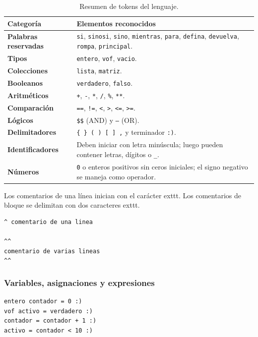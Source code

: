 \documentclass[11pt,letterpaper]{article}
\begin{document}
\begin{table}[H]
\centering
\caption{Resumen de tokens del lenguaje.}
\begin{tabularx}{\textwidth}{>{\bfseries}p{3.1cm}X}
\toprule
Categoría & Elementos reconocidos \\
\midrule
Palabras reservadas & \texttt{si}, \texttt{sinosi}, \texttt{sino}, \texttt{mientras}, \texttt{para}, \texttt{defina}, \texttt{devuelva}, \texttt{rompa}, \texttt{principal}. \\
Tipos & \texttt{entero}, \texttt{vof}, \texttt{vacio}. \\
Colecciones & \texttt{lista}, \texttt{matriz}. \\
Booleanos & \texttt{verdadero}, \texttt{falso}. \\
Aritméticos & \texttt{+}, \texttt{-}, \texttt{*}, \texttt{/}, \texttt{\%}, \texttt{**}. \\
Comparación & \texttt{==}, \texttt{!=}, \texttt{<}, \texttt{>}, \texttt{<=}, \texttt{>=}. \\
Lógicos & \texttt{\$\$} (AND) y \texttt{--} (OR). \\
Delimitadores & \texttt{\{ \} ( ) [ ] ,} y terminador \texttt{:)}. \\
Identificadores & Deben iniciar con letra minúscula; luego pueden contener letras, dígitos o \texttt{\_}. \\
Números & \texttt{0} o enteros positivos sin ceros iniciales; el signo negativo se maneja como operador. \\
\bottomrule
\end{tabularx}
\end{table}

Los comentarios de una línea inician con el carácter 	exttt{}. Los comentarios de bloque se delimitan con dos caracteres 	exttt{}.

\begin{lstlisting}[style=codigo]
^ comentario de una linea

^^
comentario de varias lineas
^^
\end{lstlisting}

\subsubsection{Variables, asignaciones y expresiones}

\begin{lstlisting}[style=codigo]
entero contador = 0 :)
vof activo = verdadero :)
contador = contador + 1 :)
activo = contador < 10 :)
\end{lstlisting}
\end{document}
